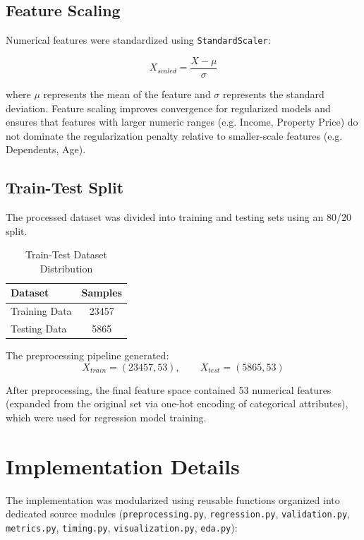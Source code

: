 \documentclass[12pt,a4paper]{article}
\begin{document}
\subsection{Feature Scaling}

Numerical features were standardized using \texttt{StandardScaler}:

\[
X_{scaled} = \frac{X-\mu}{\sigma}
\]

where $\mu$ represents the mean of the feature and $\sigma$ represents the standard deviation. Feature scaling improves convergence for regularized models and ensures that features with larger numeric ranges (e.g. Income, Property Price) do not dominate the regularization penalty relative to smaller-scale features (e.g. Dependents, Age).

\subsection{Train-Test Split}

The processed dataset was divided into training and testing sets using an 80/20 split.

\begin{table}[H]
\centering
\begin{tabular}{lc}
\toprule
Dataset & Samples \\
\midrule
Training Data & 23457 \\
Testing Data & 5865 \\
\bottomrule
\end{tabular}
\caption{Train-Test Dataset Distribution}
\end{table}

The preprocessing pipeline generated:
\[
X_{train} = (23457, 53), \qquad X_{test} = (5865, 53)
\]

After preprocessing, the final feature space contained 53 numerical features (expanded from the original set via one-hot encoding of categorical attributes), which were used for regression model training.

\section{Implementation Details}

The implementation was modularized using reusable functions organized into dedicated source modules (\texttt{preprocessing.py}, \texttt{regression.py}, \texttt{validation.py}, \texttt{metrics.py}, \texttt{timing.py}, \texttt{visualization.py}, \texttt{eda.py}):
\end{document}
